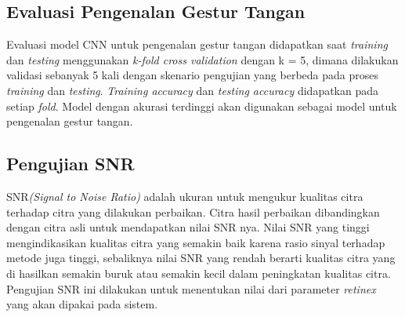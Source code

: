 \subsection{Evaluasi Pengenalan Gestur Tangan}
Evaluasi model CNN untuk pengenalan gestur tangan didapatkan saat \emph{training} dan \emph{testing} menggunakan \emph{k-fold cross validation} dengan k = 5, dimana dilakukan validasi sebanyak 5 kali dengan skenario pengujian yang berbeda pada proses \emph{training} dan \emph{testing}.
\emph{Training accuracy} dan \emph{testing accuracy} didapatkan pada setiap \emph{fold}. Model dengan akurasi terdinggi akan digunakan sebagai model untuk pengenalan gestur tangan.
\subsection{Pengujian SNR}
SNR\emph{(Signal to Noise Ratio)} adalah ukuran untuk mengukur kualitas citra terhadap citra yang dilakukan perbaikan. Citra hasil perbaikan dibandingkan dengan citra asli untuk mendapatkan nilai SNR nya. Nilai SNR yang tinggi mengindikasikan kualitas citra yang semakin baik karena rasio sinyal terhadap metode juga tinggi, sebaliknya nilai SNR yang rendah berarti kualitas citra yang di hasilkan semakin buruk atau semakin kecil dalam peningkatan kualitas citra. Pengujian SNR ini dilakukan untuk menentukan nilai dari parameter \emph{retinex} yang akan dipakai pada sistem.
